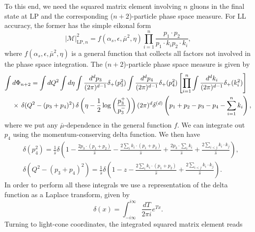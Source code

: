 \documentclass[11pt]{article}
\newcommand{\nn}{\nonumber}
\newcommand{\M}{\mathcal{M}}
\newcommand{\s}{\hat{s}}
\begin{document}
To this end, we need the squared matrix element involving $n$ gluons in the final state at LP and the corresponding 
($n+2$)-particle phase space measure. For LL accuracy, the former has the 
simple eikonal form  
\begin{equation}\label{LPsqmatrixn}
|\M|^2_{\text{LP},n} = f(\alpha_s,\epsilon,\bar\mu^2,\eta)\prod_{i=1}^n\frac{p_1\cdot p_2}{p_1\cdot k_i p_2\cdot k_i},
\end{equation}
where $f(\alpha_s,\epsilon,\bar\mu^2,\eta)$ is a general 
function that collects all factors not involved in the 
phase space integration. The ($n+2$)-particle phase 
space measure is given by
\begin{align}
\int d\Phi_{n+2}&
=\int dQ^2 \int d\eta \int\frac{d^dp_3}{(2\pi)^{d-1}}\delta_+(p_3^2)\int\frac{d^dp_4}{(2\pi)^{d-1}}\delta_+(p_4^2)\left[\prod_{i=1}^n\int\frac{d^dk_i}{(2\pi)^{d-1}}\delta_+(k_i^2)\right]\nonumber \\
&\hspace{-1.0cm}\times\, 
\delta(Q^2-(p_3+p_4)^2)
\,\delta\left(\eta-\frac12\log\left(\frac{p_3^+}{p_3^-}\right)\right)(2\pi)^d
\delta^{(d)}\left(p_1+p_2-p_3-p_4-\sum_{i=1}^n k_i\right),
\end{align}
where we put any $\bar\mu$-dependence 
in the general function $f$. We can integrate 
out $p_4$ using the momentum-conserving delta 
function. We then have
\begin{align}
    &\delta(p_4^2) = \frac{1}{\s}\delta\left(1-\frac{2p_3\cdot(p_1+p_2)}{\s}-\frac{2\sum_i k_i\cdot(p_1+p_2)}{\s}+\frac{2p_3\cdot\sum_i k_i}{\s}+\frac{2\sum_{i<j}k_i\cdot k_j}{\s}\right),\nn\\
    &\delta(Q^2-(p_3+p_4)^2) = \frac{1}{\s}\delta\left(1-z-\frac{2\sum_i k_i\cdot(p_1+p_2)}{\s}+\frac{2\sum_{i<j}k_i\cdot k_j}{\s}\right).\label{deltacorrelation}
\end{align}
In order to perform all these integrals we use a representation of the delta function as a Laplace transform, given by 
\begin{equation}\label{deltatransform}
    \delta(x) = \int_{-i\infty}^{i\infty}\frac{dT}{2\pi i}e^{Tx}.
\end{equation}
Turning to light-cone coordinates, the integrated squared matrix element reads
\end{document}
